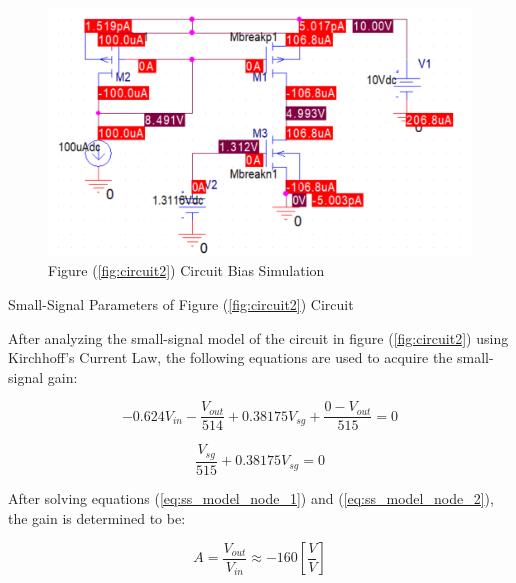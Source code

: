\FloatBarrier

\begin{figure}[h!]
	\centering
	\includegraphics[scale=0.75]{./images/circuit2_bias_sim.PNG}
	\caption{Figure (\ref{fig:circuit2}) Circuit Bias Simulation}
	\label{fig:circuit2_bias_sim}
\end{figure}

\FloatBarrier

\FloatBarrier

\begin{table}[h!]
	\centering
	\caption{Small-Signal Parameters of Figure (\ref{fig:circuit2}) Circuit}
	\label{tab:ss_params}
\end{table}

\FloatBarrier

After analyzing the small-signal model of the circuit in figure (\ref{fig:circuit2}) using Kirchhoff's Current Law, the following equations are used to acquire the small-signal gain:

\begin{equation}
	\label{eq:ss_model_node_1}
	-0.624V_{in} - \frac{V_{out}}{514} + 0.38175V_{sg} + \frac{0 - V_{out}}{515} = 0
\end{equation}

\begin{equation}
	\label{eq:ss_model_node_2}
	\frac{V_{sg}}{515} + 0.38175V_{sg} = 0
\end{equation}

After solving equations (\ref{eq:ss_model_node_1}) and (\ref{eq:ss_model_node_2}), the gain is determined to be:

\begin{equation}
	\label{eq:gain}
	A = \frac{V_{out}}{V_{in}} \approx -160 [\frac{V}{V}]
\end{equation}


